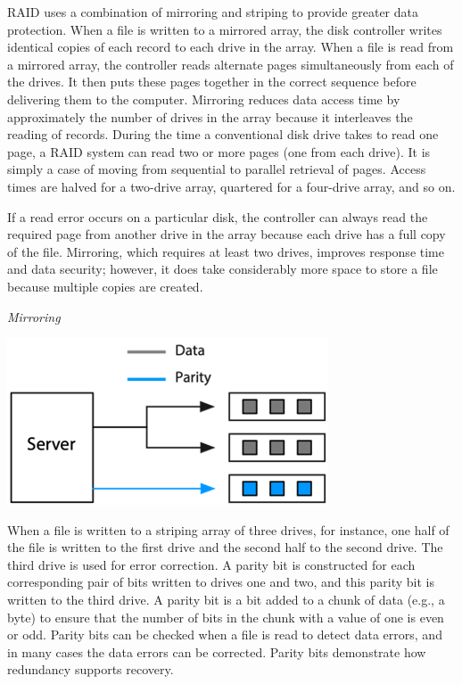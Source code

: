 \documentclass[
]{article}
\begin{document}
RAID uses a combination of mirroring and striping to provide greater
data protection. When a file is written to a mirrored array, the disk
controller writes identical copies of each record to each drive in the
array. When a file is read from a mirrored array, the controller reads
alternate pages simultaneously from each of the drives. It then puts
these pages together in the correct sequence before delivering them to
the computer. Mirroring reduces data access time by approximately the
number of drives in the array because it interleaves the reading of
records. During the time a conventional disk drive takes to read one
page, a RAID system can read two or more pages (one from each drive). It
is simply a case of moving from sequential to parallel retrieval of
pages. Access times are halved for a two-drive array, quartered for a
four-drive array, and so on.

If a read error occurs on a particular disk, the controller can always
read the required page from another drive in the array because each
drive has a full copy of the file. Mirroring, which requires at least
two drives, improves response time and data security; however, it does
take considerably more space to store a file because multiple copies are
created.

\emph{Mirroring}

\includegraphics{Figures/Chapter 20/mirroring.png}

When a file is written to a striping array of three drives, for
instance, one half of the file is written to the first drive and the
second half to the second drive. The third drive is used for error
correction. A parity bit is constructed for each corresponding pair of
bits written to drives one and two, and this parity bit is written to
the third drive. A parity bit is a bit added to a chunk of data (e.g., a
byte) to ensure that the number of bits in the chunk with a value of one
is even or odd. Parity bits can be checked when a file is read to detect
data errors, and in many cases the data errors can be corrected. Parity
bits demonstrate how redundancy supports recovery.
\end{document}
